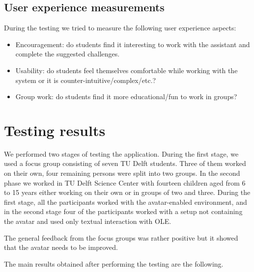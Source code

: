 \documentclass[a4paper]{article}
\begin{document}
\subsection{User experience measurements}

During the testing we tried to measure the following user experience aspects:

\begin{itemize}
	\item Encouragement: do students find it interesting to work with the assistant and complete the suggested challenges.
	\item Usability: do students feel themselves comfortable while working with the system or it is counter-intuitive/complex/etc.?
	\item Group work: do students find it more educational/fun to work in groups? 
\end{itemize}

\section{Testing results}

We performed two stages of testing the application. During the first stage, we used a focus group consisting of seven TU Delft students. Three of them worked on their own, four remaining persons were split into two groups. In the second phase we worked in TU Delft Science Center with fourteen children aged from 6 to 15 years either working on their own or in groups of two and three. During the first stage, all the participants worked with the avatar-enabled environment, and in the second stage four of the participants worked with a setup not containing the avatar and used only textual interaction with OLE. 

The general feedback from the focus groups was rather positive but it showed that the avatar needs to be improved.

The main results obtained after performing the testing are the following.
\end{document}
